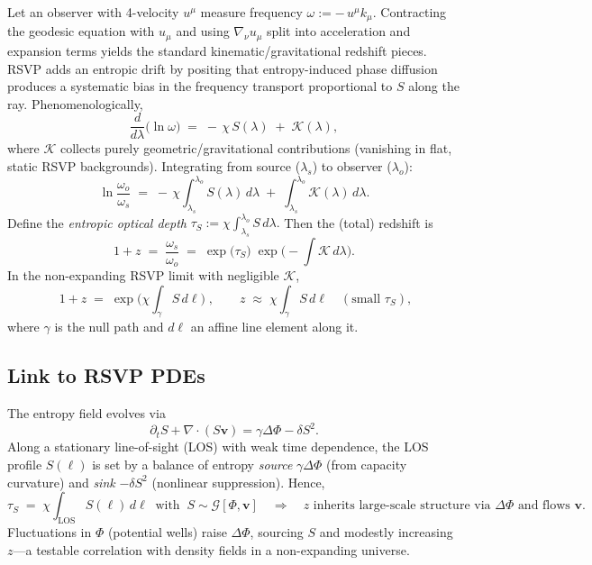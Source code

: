 \documentclass[a4paper,11pt,openany]{book}
\begin{document}
Let an observer with 4-velocity $u^\mu$ measure frequency 
\(
\omega := -\,u^\mu k_\mu.
\)
Contracting the geodesic equation with $u_\mu$ and using $\nabla_\nu u_\mu$ split into
acceleration and expansion terms yields the standard kinematic/gravitational redshift pieces.
RSVP adds an entropic drift by positing that entropy-induced phase diffusion produces a
systematic bias in the frequency transport proportional to $S$ along the ray. Phenomenologically,
\begin{equation}
\label{eq:omegadrift}
\frac{d}{d\lambda}\big(\ln \omega\big) \;=\; -\,\chi\,S(\lambda) \;+\; \mathcal{K}(\lambda),
\end{equation}
where $\mathcal{K}$ collects purely geometric/gravitational contributions (vanishing in flat,
static RSVP backgrounds). Integrating from source ($\lambda_s$) to observer ($\lambda_o$):
\begin{equation}
\label{eq:redshiftInt}
\ln\!\frac{\omega_o}{\omega_s} \;=\; -\,\chi\!\int_{\lambda_s}^{\lambda_o} \! S(\lambda)\,d\lambda 
\;+\; \int_{\lambda_s}^{\lambda_o} \!\mathcal{K}(\lambda)\,d\lambda.
\end{equation}
Define the \emph{entropic optical depth}
\(
\tau_S := \chi \int_{\lambda_s}^{\lambda_o} S\,d\lambda.
\)
Then the (total) redshift is
\begin{equation}
\label{eq:1plusz}
1+z \;=\; \frac{\omega_s}{\omega_o}
\;=\; \exp\!\big(\tau_S\big)\;\exp\!\Big(\!-\!\int \mathcal{K}\,d\lambda\Big).
\end{equation}
In the non-expanding RSVP limit with negligible $\mathcal{K}$,
\begin{equation}
\boxed{\;1+z \;=\; \exp\!\Big(\chi \int_{\gamma} S\,d\ell\Big)\;,}
\qquad 
z \;\approx\; \chi \!\int_{\gamma} S\,d\ell \quad (\text{small } \tau_S),
\end{equation}
where $\gamma$ is the null path and $d\ell$ an affine line element along it.

\subsection{Link to RSVP PDEs}

The entropy field evolves via
\[
\partial_t S + \nabla\!\cdot(S\mathbf{v}) = \gamma \Delta \Phi - \delta S^2.
\]
Along a stationary line-of-sight (LOS) with weak time dependence, the LOS profile $S(\ell)$ is
set by a balance of entropy \emph{source} $\gamma\Delta\Phi$ (from capacity curvature) and
\emph{sink} $-\delta S^2$ (nonlinear suppression). Hence,
\[
\tau_S \;=\; \chi\!\int_{\text{LOS}}\!\! S(\ell)\,d\ell
\;\;\text{with}\;\;
S \sim \mathcal{G}[\Phi,\mathbf{v}] 
\quad\Rightarrow\quad 
z \text{ inherits large-scale structure via } \Delta\Phi \text{ and flows } \mathbf{v}.
\]
Fluctuations in $\Phi$ (potential wells) raise $\Delta\Phi$, sourcing $S$ and modestly
increasing $z$—a testable correlation with density fields in a non-expanding universe.
\end{document}
